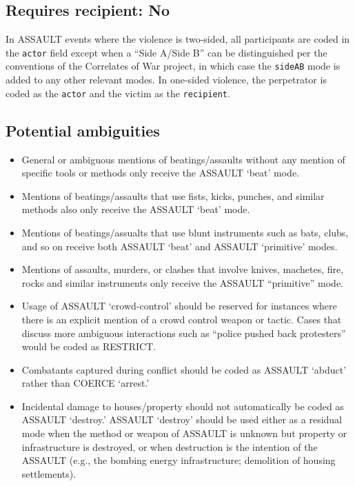 \documentclass[11pt]{report}
\newcommand{\plcat}[1]{\textsf{#1}}
\newcommand{\plmod}[1]{\texttt{#1}}
\newcommand{\txt}[1]{\texttt{#1}}
\begin{document}
\subsection{Requires recipient: No}

In \plcat{ASSAULT} events where the violence is two-sided, all participants are coded in the \txt{actor} field except when a ``Side A/Side B'' can be distinguished per the conventions of the Correlates of War project, in which case the \plmod{sideAB} mode is added to any other relevant modes. In one-sided violence, the perpetrator is coded as the \txt{actor} and the victim as the \txt{recipient}.


\subsection{Potential ambiguities}
\begin{itemize}
\item General or ambiguous mentions of beatings/assaults without any mention of specific tools or methods only receive the \plcat{ASSAULT} `beat' mode.

\item Mentions of beatings/assaults that use fists, kicks, punches, and similar methods also only receive the  \plcat{ASSAULT} `beat' mode.

\item Mentions of beatings/assualts that use blunt instruments such as bats, clubs, and so on receive both \plcat{ASSAULT}  `beat' and  \plcat{ASSAULT} `primitive' modes.
\item Mentions of assaults, murders, or clashes that involve knives, machetes, fire, rocks and similar instruments only receive the  \plcat{ASSAULT} ``primitive'' mode.
\item Usage of \plcat{ASSAULT} `crowd-control' should be reserved for instances where there is an explicit mention of a crowd control weapon or tactic. Cases that discuss more ambiguous interactions such as ``police pushed back protesters'' would be coded as \plcat{RESTRICT}.
\item Combatants captured during conflict should be coded as \plcat{ASSAULT} `abduct' rather than \plcat{COERCE} `arrest.'
\item Incidental damage to houses/property should not automatically be coded as \plcat{ASSAULT} `destroy.' \plcat{ASSAULT} `destroy' should be used either as a residual mode when the method or weapon of \plcat{ASSAULT} is unknown but property or infrastructure is destroyed, or when destruction is the intention of the \plcat{ASSAULT} (e.g., the bombing energy infrastructure; demolition of housing settlements).
\end{itemize}
\end{document}
